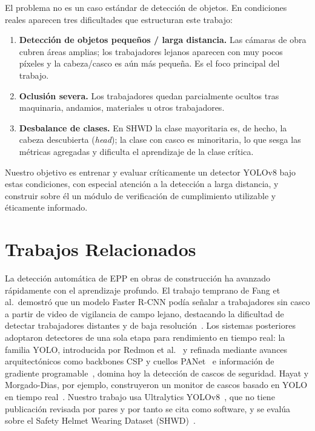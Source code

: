 \documentclass{article}
\begin{document}
El problema no es un caso estándar de detección de objetos. En condiciones reales
aparecen tres dificultades que estructuran este trabajo:
\begin{enumerate}
  \item \textbf{Detección de objetos pequeños / larga distancia.} Las cámaras de
  obra cubren áreas amplias; los trabajadores lejanos aparecen con muy pocos
  píxeles y la cabeza/casco es aún más pequeña. Es el foco principal del trabajo.
  \item \textbf{Oclusión severa.} Los trabajadores quedan parcialmente ocultos
  tras maquinaria, andamios, materiales u otros trabajadores.
  \item \textbf{Desbalance de clases.} En SHWD la clase mayoritaria es, de hecho,
  la cabeza descubierta (\emph{head}); la clase con casco es minoritaria, lo que
  sesga las métricas agregadas y dificulta el aprendizaje de la clase crítica.
\end{enumerate}
Nuestro objetivo es entrenar y evaluar críticamente un detector YOLOv8 bajo estas
condiciones, con especial atención a la detección a larga distancia, y construir
sobre él un módulo de verificación de cumplimiento utilizable y éticamente
informado.

\section{Trabajos Relacionados}
La detección automática de EPP en obras de construcción ha avanzado rápidamente
con el aprendizaje profundo. El trabajo temprano de Fang et al.\ demostró que un
modelo Faster R-CNN podía señalar a trabajadores sin casco a partir de video de
vigilancia de campo lejano, destacando la dificultad de detectar trabajadores
distantes y de baja resolución~\citep{fang2018nonhardhat}. Los sistemas
posteriores adoptaron detectores de una sola etapa para rendimiento en tiempo
real: la familia YOLO, introducida por Redmon et al.~\citep{redmon2016yolo} y
refinada mediante avances arquitectónicos como backbones CSP y cuellos
PANet~\citep{bochkovskiy2020yolov4} e información de gradiente
programable~\citep{wang2024yolov9}, domina hoy la detección de cascos de
seguridad. Hayat y Morgado-Dias, por ejemplo, construyeron un monitor de cascos
basado en YOLO en tiempo real~\citep{hayat2022helmet}. Nuestro trabajo usa
Ultralytics YOLOv8~\citep{jocher2023yolov8}, que no tiene publicación revisada por
pares y por tanto se cita como software, y se evalúa sobre el Safety Helmet Wearing
Dataset (SHWD)~\citep{njvisionpower2019shwd}.
\end{document}
